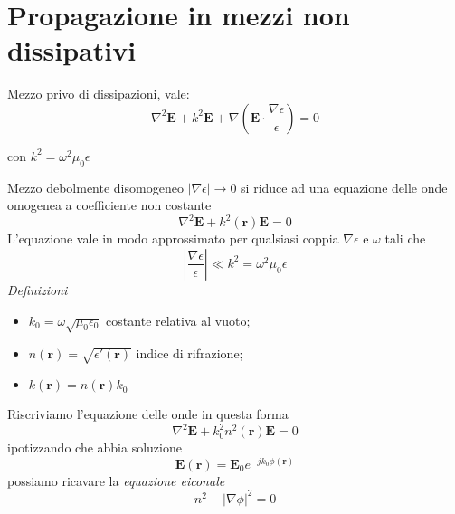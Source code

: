 \documentclass[a4paper]{article}
\begin{document}
\section{Propagazione in mezzi non dissipativi}
Mezzo privo di dissipazioni, vale:
\begin{equation*}
\nabla^2\textbf{E}+k^2\textbf{E}+\nabla\left(\textbf{E}\cdot\frac{\nabla\epsilon}{\epsilon}\right)=0
\end{equation*}
\begin{flushright}
con $k^2=\omega^2\mu_0\epsilon$
\end{flushright}
Mezzo debolmente disomogeneo $|\nabla\epsilon|\rightarrow0$ si riduce ad una equazione delle onde omogenea a coefficiente non costante
\begin{equation*}
\nabla^2\textbf{E}+k^2(\textbf{r})\textbf{E}=0
\end{equation*}
L'equazione vale in modo approssimato per qualsiasi coppia $\nabla\epsilon$ e $\omega$ tali che
\begin{equation*}
\left|\frac{\nabla\epsilon}{\epsilon}\right|\ll k^2=\omega^2\mu_0\epsilon
\end{equation*}
\emph{Definizioni}
\begin{itemize}
\item $k_0=\omega\sqrt{\mu_0\epsilon_0}$ costante relativa al vuoto;
\item $n(\textbf{r})=\sqrt{\epsilon'(\textbf{r})}$ indice di rifrazione;
\item $k(\textbf{r})=n(\textbf{r})k_0$
\end{itemize}
Riscriviamo l'equazione delle onde in questa forma
\begin{equation*}
\nabla^2\textbf{E}+k_0^2n^2(\textbf{r})\textbf{E}=0
\end{equation*}
ipotizzando che abbia soluzione
\begin{equation*}
\textbf{E}(\textbf{r})=\textbf{E}_0e^{-jk_0\phi(\textbf{r})}
\end{equation*}
possiamo ricavare la \emph{equazione eiconale}
\begin{equation*}
n^2-|\nabla\phi|^2=0
\end{equation*}
\end{document}
